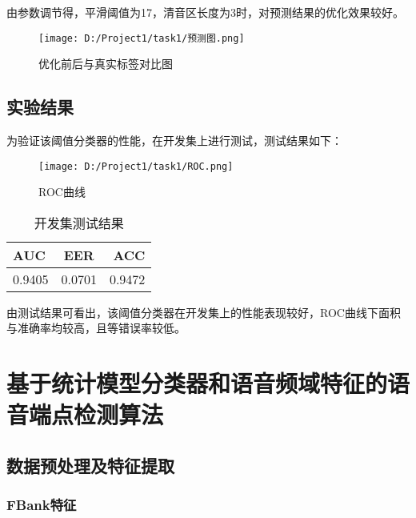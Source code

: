 \documentclass[a4paper]{article}
\begin{document}
由参数调节得，平滑阈值为17，清音区长度为3时，对预测结果的优化效果较好。

\begin{figure}[H]
    \centering
  \texttt{[image: D:/Project1/task1/预测图.png]}
  \caption{优化前后与真实标签对比图}
\end{figure}

\subsection{实验结果}


为验证该阈值分类器的性能，在开发集上进行测试，测试结果如下：

\begin{figure}[H]
    \centering
  \texttt{[image: D:/Project1/task1/ROC.png]}
  \caption{ROC曲线}
\end{figure}

\begin{table}[H]
    \caption{开发集测试结果}
    \centering
    \begin{tabular}{ l c r }
        \toprule
        \textbf{AUC} & \textbf{EER} & \textbf{ACC} \\
        \midrule
        0.9405 & 0.0701 & 0.9472 \\
        \bottomrule
    \end{tabular}
\end{table}

由测试结果可看出，该阈值分类器在开发集上的性能表现较好，ROC曲线下面积与准确率均较高，且等错误率较低。

\section{基于统计模型分类器和语音频域特征的语音端点检测算法}

\subsection{数据预处理及特征提取}


\subsubsection{FBank特征}
\end{document}
